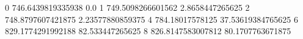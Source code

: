 0 746.6439819335938 0.0
1 749.5098266601562 2.8658447265625
2 748.8797607421875 2.23577880859375
4 784.18017578125 37.53619384765625
6 829.1774291992188 82.533447265625
8 826.8147583007812 80.1707763671875
